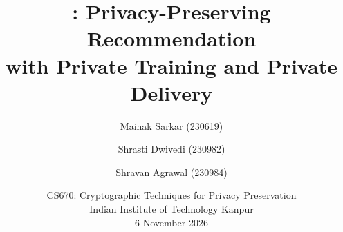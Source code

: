 \documentclass[11pt]{article}
\begin{document}
\title{\bfseries \sys: Privacy-Preserving Recommendation\\
       with Private Training and Private Delivery}

\author{Mainak Sarkar (230619) \and Shrasti Dwivedi (230982) \and
        Shravan Agrawal (230984)}

\date{CS670: Cryptographic Techniques for Privacy Preservation\\
      Indian Institute of Technology Kanpur \\
      6 November 2026}

\maketitle



\tableofcontents
\newpage
















\appendix
\end{document}
